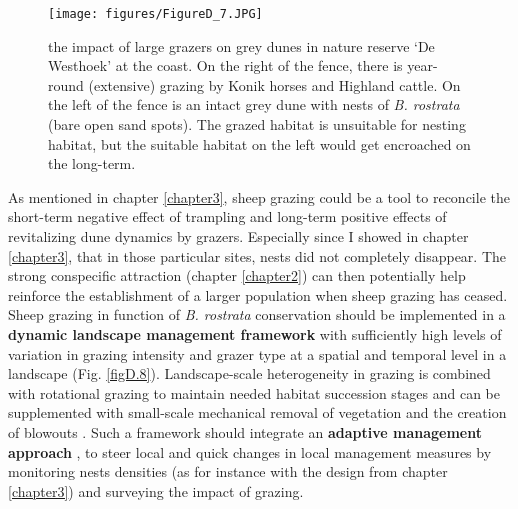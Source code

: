 \documentclass[10pt, twoside]{book} %
\begin{document}
	\begin{figure}[ht!]
		\begin{center}
			\texttt{[image: figures/FigureD\_7.JPG]}
		\end{center}
		\begin{footnotesize}
			\caption{the impact of large grazers on grey dunes in nature reserve `De Westhoek' at the coast. On the right of the fence, there is year-round (extensive) grazing by Konik horses and Highland cattle. On the left of the fence is an intact grey dune with nests of \textit{B. rostrata} (bare open sand spots). The grazed habitat is unsuitable for nesting habitat, but the suitable habitat on the left would get encroached on the long-term. \label{figD.7}}
		\end{footnotesize}
	\end{figure}

	\enlargethispage{1\baselineskip}
	As mentioned in chapter \ref{chapter3}, sheep grazing could be a tool to reconcile the short-term negative effect of trampling and long-term positive effects of revitalizing dune dynamics by grazers. Especially since I showed in chapter \ref{chapter3}, that in those particular sites, nests did not completely disappear. The strong conspecific attraction (chapter \ref{chapter2}) can then potentially help reinforce the establishment of a larger population when sheep grazing has ceased. Sheep grazing in function of \textit{B. rostrata} conservation should be implemented in a \textbf{dynamic landscape management framework} with sufficiently high levels of variation in grazing intensity and grazer type at a spatial and temporal level in a landscape (Fig. \ref{figD.8}). Landscape-scale heterogeneity in grazing is combined with rotational grazing to maintain needed habitat succession stages and can be supplemented with small-scale mechanical removal of vegetation and the creation of blowouts \citep{vanboxel1997}. Such a framework should integrate an \textbf{adaptive management approach} \citep{sutherland2020}, to steer local and quick changes in local management measures by monitoring nests densities (as for instance with the design from chapter \ref{chapter3}) and surveying the impact of grazing.\\
	
\end{document}
